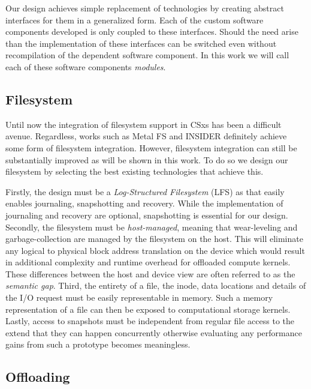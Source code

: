Our design achieves simple replacement of technologies by creating abstract
interfaces for them in a generalized form. Each of the custom software
components developed is only coupled to these interfaces. Should the need arise
than the implementation of these interfaces can be switched even without
recompilation of the dependent software component. In this work we will call
each of these software components \textit{modules}.

\subsection{Filesystem}

Until now the integration of filesystem support in CSxs has been a difficult
avenue. Regardless, works such as Metal FS \cite{10.1145/3415580} and INSIDER
\cite{234968} definitely achieve some form of filesystem integration. However,
filesystem integration can still be substantially improved as will be shown in
this work. To do so we design our filesystem by selecting the best existing
technologies that achieve this.

Firstly, the design must be a \textit{Log-Structured Filesystem} (LFS) as that
easily enables journaling, snapshotting and recovery. While the implementation
of journaling and recovery are optional, snapshotting is essential for our
design. Secondly, the filesystem must be \textit{host-managed}, meaning that
wear-leveling and garbage-collection are managed by the filesystem on the host.
This will eliminate any logical to physical block address translation on the
device which would result in additional complexity and runtime overhead for
offloaded compute kernels. These differences between the host and device view
are often referred to as the \textit{semantic gap}. Third, the entirety of a
file, the inode, data locations and details of the I/O request must be easily
representable in memory. Such a memory representation of a file can then be
exposed to computational storage kernels. Lastly, access to snapshots must be
independent from regular file access to the extend that they can happen
concurrently otherwise evaluating any performance gains from such a prototype
becomes meaningless.

\subsection{Offloading}

\label{extendedcase}

